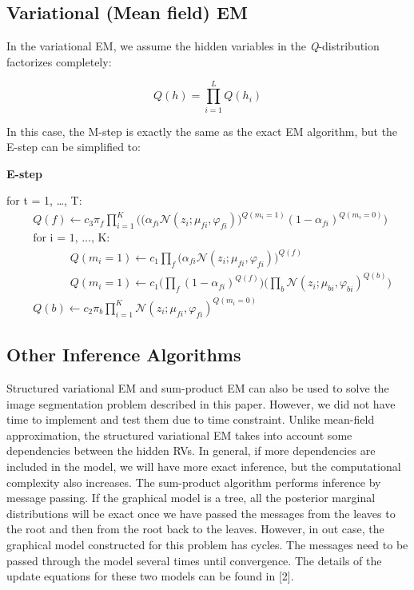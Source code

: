 \documentclass{article} %
\begin{document}
\subsection{Variational (Mean field) EM}
\label{variational_em}

In the variational EM, we assume the hidden variables in the \textit{Q}-distribution factorizes completely:

\begin{equation}
Q(h) = \prod_{i=1}^LQ(h_i) 
\label{eq:eq9}
\end{equation}

In this case, the M-step is exactly the same as the exact EM algorithm, but the E-step can be simplified to:

\textbf{E-step}

for t = 1, \ldots , T:
\begin{align*} 
&Q(f) \leftarrow c_3\pi_f\prod_{i=1}^K\Bigg(\Big(\alpha_{fi}\mathcal{N}(z_i;\mu_{fi},\varphi_{fi})\Big)^{Q(m_i=1)} (1-\alpha_{fi})^{Q(m_i=0)} \Bigg) \\
&\text{for i = 1, \ldots , K: } \\
&\text{ }\text{ }\text{ }\text{ }\text{ }Q(m_i = 1) \leftarrow c_1\prod_{f}\Bigg(\alpha_{fi}\mathcal{N}(z_i;\mu_{fi},\varphi_{fi})\Bigg)^{Q(f)}\\
&\text{ }\text{ }\text{ }\text{ }\text{ }Q(m_i = 1) \leftarrow c_1\Bigg(\prod_{f}(1-\alpha_{fi})^{Q(f)}\Bigg)\Bigg(\prod_{b}\mathcal{N}(z_i;\mu_{bi},\varphi_{bi})^{Q(b)}\Bigg)\\
&Q(b) \leftarrow c_2\pi_b\prod_{i=1}^K\mathcal{N}(z_i;\mu_{fi},\varphi_{fi})^{Q(m_i=0)}
\end{align*} 

\subsection{Other Inference Algorithms}
Structured variational EM and sum-product EM can also be used to solve the image segmentation problem described in this paper. However, we did not have time to implement and test them due to time constraint. Unlike mean-field approximation, the structured variational EM takes into account some dependencies between the hidden RVs. In general, if more dependencies are included in the model, we will have more exact inference, but the computational complexity also increases. The sum-product algorithm performs inference by message passing. If the graphical model is a tree, all the posterior marginal distributions will be exact once we have passed the messages from the leaves to the root and then from the root back to the leaves. However, in out case, the graphical model constructed for this problem has cycles. The messages need to be passed through the model several times until convergence. The details of the update equations for these two models can be found in [2].
\end{document}
